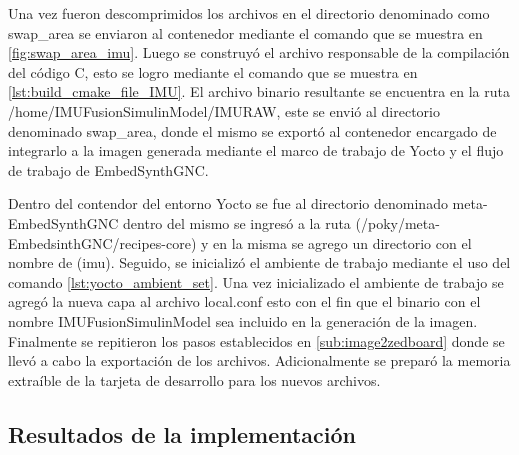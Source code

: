 Una vez fueron descomprimidos los archivos en el directorio denominado como swap\_area se enviaron al contenedor mediante el comando que se muestra en \ref{fig:swap_area_imu}. Luego se construyó el archivo responsable de la compilación del código C, esto se logro mediante el comando que se muestra en \ref{lst:build_cmake_file_IMU}. El archivo binario resultante se encuentra en la ruta /home/IMUFusionSimulinModel/IMURAW, este se envió al directorio denominado swap\_area, donde el mismo se exportó al contenedor encargado de integrarlo a la imagen generada mediante el marco de trabajo de Yocto y el flujo de trabajo de EmbedSynthGNC. 


Dentro del contendor del entorno Yocto se fue al directorio denominado meta-EmbedSynthGNC dentro del mismo se ingresó a la ruta (/poky/meta-EmbedsinthGNC/recipes-core) y en la misma se agrego un directorio con el nombre de (imu). Seguido, se inicializó el ambiente de trabajo mediante el uso del comando \ref{lst:yocto_ambient_set}. Una vez inicializado el ambiente de trabajo se agregó la nueva capa al archivo local.conf esto con el fin que el binario con el nombre IMUFusionSimulinModel sea incluido en la generación de la imagen. Finalmente se repitieron los pasos establecidos en \ref{sub:image2zedboard} donde se llevó a cabo la exportación de los archivos. Adicionalmente se preparó la memoria extraíble de la tarjeta de desarrollo para los nuevos archivos.

\newpage

\subsection{Resultados de la implementación}

